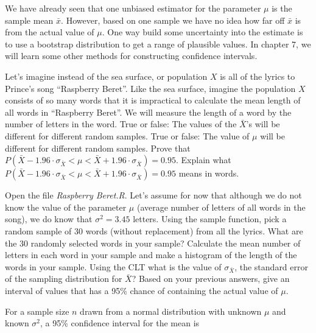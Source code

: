 \bi
\ii We have already seen that one unbiased estimator for the parameter $\mu$ is the sample mean $\bar{x}$.
\ii However, based on one sample we have no idea how far off $\bar{x}$ is from the actual value of $\mu$.
\ii One way build some uncertainty into the estimate is to use a bootstrap distribution to get a range of plausible values.
\ii In chapter 7, we will learn some other methods for constructing confidence intervals.
\ei

\bb
\ii Let's imagine instead of the sea surface, or population $X$ is all of the lyrics to Prince's song ``Raspberry Beret''. Like the sea surface, imagine the population $X$ consists of so many words that it is impractical to calculate the mean length of all words in ``Raspberry Beret''.  We will measure the length of a word by the number of letters in the word.
\bb
\ii True or false: The values of the $\bar{X}$'s will be different for different random samples. \bs
\ii True or false: The value of $\mu$ will be different for different random samples. \bs
\ii Prove that $P\left( \bar{X} - 1.96 \cdot \sigma_{\bar{X}} < \mu < \bar{X}+1.96 \cdot \sigma_{\bar{X}} \right) = 0.95$. \vfill
\ii Explain what $P\left( \bar{X} - 1.96\cdot  \sigma_{\bar{X}} < \mu < \bar{X}+1.96 \cdot \sigma_{\bar{X}} \right) = 0.95$ means in words. \vfill
\ee

\clearpage

\ii Open the file \textit{Raspberry Beret.R}.  Let's assume for now that although we do not know the value of the parameter $\mu$ (average number of letters of all words in the song), we do know that $\sigma^2 = 3.45$ letters.
\bb
\ii Using the sample function, pick a random sample of 30 words (without replacement) from all the lyrics. What are the 30 randomly selected words in your sample? \vspace{1.25in}
\ii Calculate the mean number of letters in each word in your sample and make a histogram of the length of the words in your sample. \vspace{0.5in}
\ii Using the CLT what is the value of $\sigma_{\bar{X}}$, the standard error of the sampling distribution for $\bar{X}$? \vspace{1in}
\ii Based on your previous answers, give an interval of values that has a 95\% chance of containing the actual value of $\mu$. \vfill
\ee
\ee

\bbox
For a sample size $n$ drawn from a normal distribution with unknown $\mu$ and known $\sigma^2$, a 95\% confidence interval for the mean is
\vspace{1in}

